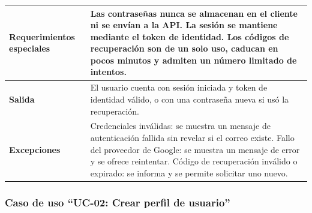 \documentclass[doc,12pt,a4paper]{apa7}
\begin{document}
\begin{longtable}{|P{3.3cm}|L{11.2cm}|}
\textbf{Requerimientos especiales} & Las contraseñas nunca se almacenan en el cliente ni se envían a la API. La sesión se mantiene mediante el token de identidad. Los códigos de recuperación son de un solo uso, caducan en pocos minutos y admiten un número limitado de intentos. \\ \hline
\textbf{Salida} & El usuario cuenta con sesión iniciada y token de identidad válido, o con una contraseña nueva si usó la recuperación. \\ \hline
\textbf{Excepciones} & Credenciales inválidas: se muestra un mensaje de autenticación fallida sin revelar si el correo existe. Fallo del proveedor de Google: se muestra un mensaje de error y se ofrece reintentar. Código de recuperación inválido o expirado: se informa y se permite solicitar uno nuevo. \\ \hline
\end{longtable}

\subsubsection{Caso de uso ``UC-02: Crear perfil de usuario''}
\end{document}
